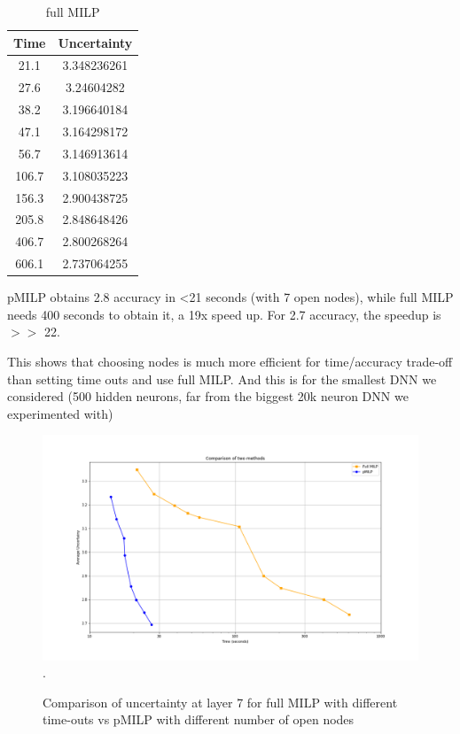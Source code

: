 	
	\begin{table}[h!]
		\centering
		\begin{tabular}{|c|c|}
			\hline
			Time & Uncertainty\\ 
			\hline	21.1 & 3.348236261\\
			\hline	27.6 & 3.24604282\\
			\hline	38.2 & 3.196640184\\
			\hline	47.1 & 3.164298172\\
			\hline	56.7 & 3.146913614\\
			\hline	106.7 & 3.108035223\\
			\hline	156.3 & 2.900438725\\
			\hline	205.8 & 2.848648426\\	
			\hline	406.7 & 2.800268264 \\	
			\hline	606.1 & 2.737064255\\	
			\hline
			
			
		\end{tabular}
		\caption{full MILP}
		\label{table13}
	\end{table}
	

pMILP obtains 2.8 accuracy in <21 seconds (with 7 open nodes), while full MILP needs 400 seconds to obtain it, a 19x speed up. For 2.7 accuracy, the speedup is $>>$ 22.

This shows that choosing nodes is much more efficient for time/accuracy trade-off than setting time outs and use full MILP. And this is for the smallest DNN we considered (500 hidden neurons, far from the biggest 20k neuron DNN we experimented with)
	
	
	\begin{figure}[h]\hspace*{-0.8cm}
			\includegraphics[scale=0.4]{Layer7_comparison.png}.
			\caption{Comparison of uncertainty at layer 7 for full MILP with different time-outs vs pMILP with different number of open nodes}
			\label{fig3}
	\end{figure}
	
